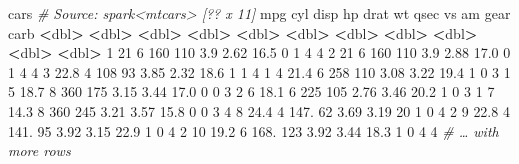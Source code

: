 \documentclass[
]{article}
\newenvironment{Shaded}{\begin{snugshade}}{\end{snugshade}}
\newcommand{\CommentTok}[1]{\textcolor[rgb]{0.56,0.35,0.01}{\textit{#1}}}
\newcommand{\DecValTok}[1]{\textcolor[rgb]{0.00,0.00,0.81}{#1}}
\newcommand{\ErrorTok}[1]{\textcolor[rgb]{0.64,0.00,0.00}{\textbf{#1}}}
\newcommand{\FloatTok}[1]{\textcolor[rgb]{0.00,0.00,0.81}{#1}}
\newcommand{\NormalTok}[1]{#1}
\newcommand{\OperatorTok}[1]{\textcolor[rgb]{0.81,0.36,0.00}{\textbf{#1}}}
\newcommand{\StringTok}[1]{\textcolor[rgb]{0.31,0.60,0.02}{#1}}
\begin{document}
\begin{Shaded}
\begin{Highlighting}[]
\NormalTok{cars}
\CommentTok{# Source: spark<mtcars> [?? x 11]}
\NormalTok{mpg cyl disp hp drat wt qsec vs am gear carb}
\OperatorTok{<}\NormalTok{dbl}\OperatorTok{>}\StringTok{ }\ErrorTok{<}\NormalTok{dbl}\OperatorTok{>}\StringTok{ }\ErrorTok{<}\NormalTok{dbl}\OperatorTok{>}\StringTok{ }\ErrorTok{<}\NormalTok{dbl}\OperatorTok{>}\StringTok{ }\ErrorTok{<}\NormalTok{dbl}\OperatorTok{>}\StringTok{ }\ErrorTok{<}\NormalTok{dbl}\OperatorTok{>}\StringTok{ }\ErrorTok{<}\NormalTok{dbl}\OperatorTok{>}\StringTok{ }\ErrorTok{<}\NormalTok{dbl}\OperatorTok{>}\StringTok{ }\ErrorTok{<}\NormalTok{dbl}\OperatorTok{>}\StringTok{ }\ErrorTok{<}\NormalTok{dbl}\OperatorTok{>}\StringTok{ }\ErrorTok{<}\NormalTok{dbl}\OperatorTok{>}
\DecValTok{1} \DecValTok{21} \DecValTok{6} \DecValTok{160} \DecValTok{110} \FloatTok{3.9} \FloatTok{2.62} \FloatTok{16.5} \DecValTok{0} \DecValTok{1} \DecValTok{4} \DecValTok{4}
\DecValTok{2} \DecValTok{21} \DecValTok{6} \DecValTok{160} \DecValTok{110} \FloatTok{3.9} \FloatTok{2.88} \FloatTok{17.0} \DecValTok{0} \DecValTok{1} \DecValTok{4} \DecValTok{4}
\DecValTok{3} \FloatTok{22.8} \DecValTok{4} \DecValTok{108} \DecValTok{93} \FloatTok{3.85} \FloatTok{2.32} \FloatTok{18.6} \DecValTok{1} \DecValTok{1} \DecValTok{4} \DecValTok{1}
\DecValTok{4} \FloatTok{21.4} \DecValTok{6} \DecValTok{258} \DecValTok{110} \FloatTok{3.08} \FloatTok{3.22} \FloatTok{19.4} \DecValTok{1} \DecValTok{0} \DecValTok{3} \DecValTok{1}
\DecValTok{5} \FloatTok{18.7} \DecValTok{8} \DecValTok{360} \DecValTok{175} \FloatTok{3.15} \FloatTok{3.44} \FloatTok{17.0} \DecValTok{0} \DecValTok{0} \DecValTok{3} \DecValTok{2}
\DecValTok{6} \FloatTok{18.1} \DecValTok{6} \DecValTok{225} \DecValTok{105} \FloatTok{2.76} \FloatTok{3.46} \FloatTok{20.2} \DecValTok{1} \DecValTok{0} \DecValTok{3} \DecValTok{1}
\DecValTok{7} \FloatTok{14.3} \DecValTok{8} \DecValTok{360} \DecValTok{245} \FloatTok{3.21} \FloatTok{3.57} \FloatTok{15.8} \DecValTok{0} \DecValTok{0} \DecValTok{3} \DecValTok{4}
\DecValTok{8} \FloatTok{24.4} \DecValTok{4} \FloatTok{147.} \DecValTok{62} \FloatTok{3.69} \FloatTok{3.19} \DecValTok{20} \DecValTok{1} \DecValTok{0} \DecValTok{4} \DecValTok{2}
\DecValTok{9} \FloatTok{22.8} \DecValTok{4} \FloatTok{141.} \DecValTok{95} \FloatTok{3.92} \FloatTok{3.15} \FloatTok{22.9} \DecValTok{1} \DecValTok{0} \DecValTok{4} \DecValTok{2}
\DecValTok{10} \FloatTok{19.2} \DecValTok{6} \FloatTok{168.} \DecValTok{123} \FloatTok{3.92} \FloatTok{3.44} \FloatTok{18.3} \DecValTok{1} \DecValTok{0} \DecValTok{4} \DecValTok{4}
\CommentTok{# … with more rows}
\end{Highlighting}
\end{Shaded}
\end{document}
